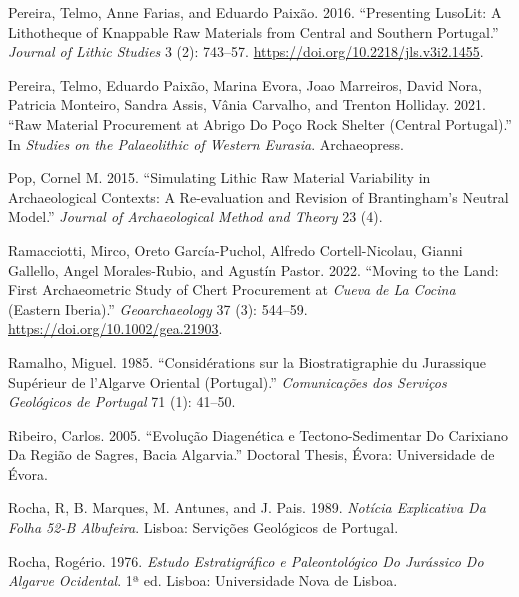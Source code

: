 \documentclass[
  a4paper,
  DIV=11,
  numbers=noendperiod]{scrreprt}
\newlength{\cslhangindent}
\newenvironment{CSLReferences}[2] %
 {\begin{list}{}{%
  \setlength{\itemindent}{0pt}
  \setlength{\leftmargin}{0pt}
  \setlength{\parsep}{0pt}
  \ifodd #1
   \setlength{\leftmargin}{\cslhangindent}
   \setlength{\itemindent}{-1\cslhangindent}
  \fi
  \setlength{\itemsep}{#2\baselineskip}}}
 {\end{list}}
\begin{document}
\begin{CSLReferences}{1}{0}
Pereira, Telmo, Anne Farias, and Eduardo Paixão. 2016. {``Presenting
{LusoLit}: {A} Lithotheque of Knappable Raw Materials from Central and
Southern {Portugal}.''} \emph{Journal of Lithic Studies} 3 (2): 743--57.
\url{https://doi.org/10.2218/jls.v3i2.1455}.

Pereira, Telmo, Eduardo Paixão, Marina Evora, Joao Marreiros, David
Nora, Patricia Monteiro, Sandra Assis, Vânia Carvalho, and Trenton
Holliday. 2021. {``Raw Material Procurement at {Abrigo} Do {Po{ç}o Rock}
Shelter ({Central Portugal}).''} In \emph{Studies on the {Palaeolithic}
of {Western Eurasia}}. Archaeopress.

Pop, Cornel M. 2015. {``Simulating {Lithic Raw Material Variability} in
{Archaeological Contexts}: {A Re-evaluation} and {Revision} of
{Brantingham}'s {Neutral Model}.''} \emph{Journal of Archaeological
Method and Theory} 23 (4).

Ramacciotti, Mirco, Oreto García-Puchol, Alfredo Cortell-Nicolau, Gianni
Gallello, Angel Morales-Rubio, and Agustín Pastor. 2022. {``Moving to
the Land: {First} Archaeometric Study of Chert Procurement at
{\emph{Cueva}}{ \emph{de La} }{\emph{Cocina}} ({Eastern Iberia}).''}
\emph{Geoarchaeology} 37 (3): 544--59.
\url{https://doi.org/10.1002/gea.21903}.

Ramalho, Miguel. 1985. {``{Consid{é}rations sur la Biostratigraphie du
Jurassique Sup{é}rieur de l'Algarve Oriental (Portugal)}.''}
\emph{Comunica{ç}{õ}es dos Servi{ç}os Geol{ó}gicos de Portugal} 71 (1):
41--50.

Ribeiro, Carlos. 2005. {``Evolu{ç}{ã}o {Diagen{é}tica} e
{Tectono-Sedimentar} Do {Carixiano} Da {Regi{ã}o} de {Sagres}, {Bacia
Algarvia}.''} Doctoral Thesis, {É}vora: Universidade de {É}vora.

Rocha, R, B. Marques, M. Antunes, and J. Pais. 1989. \emph{Not{í}cia
Explicativa Da Folha 52-{B Albufeira}}. Lisboa: Servi{ç}{õ}es
Geol{ó}gicos de Portugal.

Rocha, Rogério. 1976. \emph{Estudo {Estratigr{á}fico} e
{Paleontol{ó}gico} Do {Jur{á}ssico} Do {Algarve Ocidental}}. 1ª ed.
Lisboa: Universidade Nova de Lisboa.


\end{CSLReferences}
\end{document}
